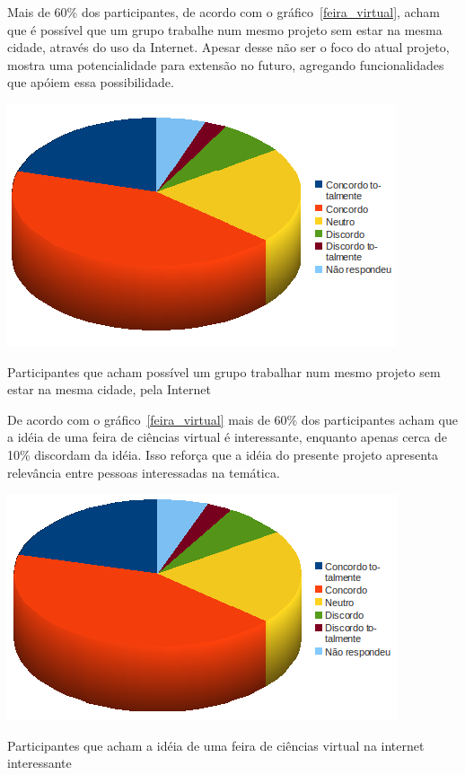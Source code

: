     Mais de 60\% dos participantes, de acordo com o gráfico~\ref{feira_virtual}, acham que é possível que um grupo trabalhe num mesmo projeto sem estar na mesma cidade, através do uso da Internet. Apesar desse não ser o foco do atual projeto, mostra uma potencialidade para extensão no futuro, agregando funcionalidades que apóiem essa possibilidade.

    \begin{grafico}
        \begin{center}
    \includegraphics[width=0.7\linewidth]{arquivos/trabalho_online.png}
        \end{center}
        \caption{Participantes que acham possível um grupo trabalhar num mesmo projeto sem estar na mesma cidade, pela Internet}
        \label{trabalho_online}
    \end{grafico}

    De acordo com o gráfico~\ref{feira_virtual} mais de 60\% dos participantes acham que a idéia de uma feira de ciências virtual é interessante, enquanto apenas cerca de 10\% discordam da idéia. Isso reforça que a idéia do presente projeto apresenta relevância entre pessoas interessadas na temática.

    \begin{grafico}
        \begin{center}
    \includegraphics[width=0.7\linewidth]{arquivos/feira_virtual.png}
        \end{center}
        \caption{Participantes que acham a idéia de uma feira de ciências virtual na internet interessante}
        \label{feira_virtual}
    \end{grafico}

